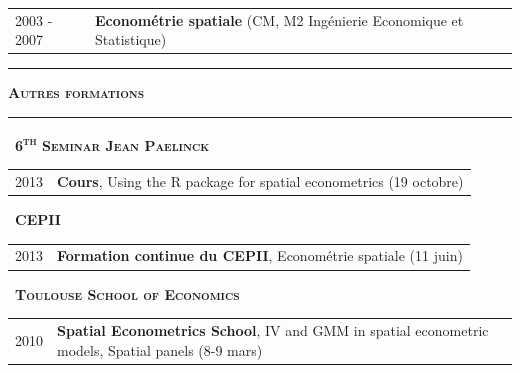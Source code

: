 \documentclass[a4paper,12pt]{article}
\newcommand{\titre}[1]{%
	\bigskip
	\noindent \rule[2mm]{\textwidth}{0.5pt}
	\textbf{\textsc{\large #1}} \\
	\noindent \rule[1mm]{\textwidth}{0.5pt}
	}
\newcommand{\smalltitre}[1]{%
	\noindent \textbullet~\textsc{\textbf{#1}}
	\smallskip
	}
\begin{document}
\noindent \begin{longtable}{@{}p{\annee}p{\texte}@{}}
2003 - 2007 & \textbf{Econométrie spatiale} (CM, M2 Ingénierie Economique et Statistique) \\
\end{longtable}


\titre{Autres formations}

\smalltitre{6\textsuperscript{th} Seminar Jean Paelinck}

\noindent \begin{longtable}{@{}p{\annee}p{\texte}@{}}
2013 & \textbf{Cours}, \og{}Using the R package for spatial econometrics\fg{} (19 octobre) \\
\end{longtable}

\smalltitre{CEPII}

\noindent \begin{longtable}{@{}p{\annee}p{\texte}@{}}
2013 & \textbf{Formation continue du CEPII}, \og{}Econométrie spatiale\fg{} (11 juin) \\
\end{longtable}

\smalltitre{Toulouse School of Economics}

\noindent \begin{longtable}{@{}p{\annee}p{\texte}@{}}
2010 & \textbf{Spatial Econometrics School}, \og{}IV and GMM in spatial econometric models\fg{}, \og{}Spatial panels\fg{} (8-9 mars) \\
\end{longtable}
\end{document}
